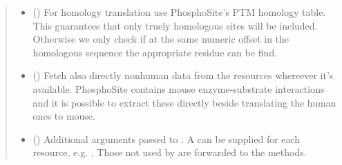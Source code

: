 \documentclass[letterpaper,10pt,english]{sphinxmanual}
\begin{document}
\begin{fulllineitems}
\begin{fulllineitems}
\begin{quote}
\begin{description}
\begin{itemize}
\item {} 
 () \textendash{} For homology translation use
PhosphoSite’s PTM homology table. This guarantees that only
truely homologous sites will be included. Otherwise we only
check if at the same numeric offset in the homologous sequence
the appropriate residue can be find.

\item {} 
 () \textendash{} Fetch also directly nonhuman
data from the resources whereever it’s available. PhosphoSite
contains mouse enzyme-substrate interactions and it is possible
to extract these directly beside translating the human ones
to mouse.

\item {} 
 () \textendash{} Additional arguments passed to .
A  can be supplied for each resource, e.g.
.
Those not used by  are forwarded to the
 methods.

\end{itemize}

\end{description}\end{quote}

\end{fulllineitems}


\begin{fulllineitems}
\label{\detokenize{main:pypath.main.PyPath.load_reflist}}
\end{fulllineitems}


\begin{fulllineitems}
\label{\detokenize{main:pypath.main.PyPath.load_reflists}}
\end{fulllineitems}


\end{fulllineitems}
\end{document}
